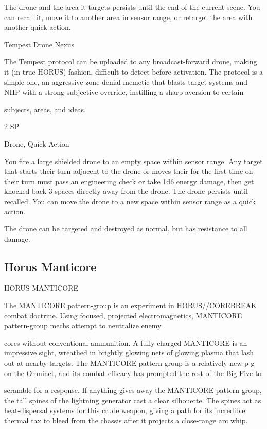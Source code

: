 The drone and the area it targets persists until the end of the current scene. You can recall it,  
move it to another area in sensor range, or retarget the area with another quick action.
 

Tempest Drone Nexus  

The Tempest protocol can be uploaded to any broadcast-forward drone, making it (in true HORUS) fashion,  
difficult to detect before activation. The protocol is a simple one, an aggressive zone-denial memetic that  
blasts target systems and NHP with a strong subjective override, instilling a sharp aversion to certain  

subjects, areas, and ideas.     

2 SP
 

Drone, Quick Action
 

You fire a large shielded drone to an empty space within sensor range. Any target that starts their  
turn adjacent to the drone or moves their for the first time on their turn must pass an engineering  
check or take 1d6 energy damage, then get knocked back 3 spaces directly away from the  
drone. The drone persists until recalled. You can move the drone to a new space within sensor  
range as a quick action. 
 

The drone can be targeted and destroyed as normal, but has resistance to all damage.
 

                                                                                                               
\subsection{Horus Manticore}

                                        HORUS MANTICORE  

The MANTICORE pattern-group is an experiment in HORUS//COREBREAK combat doctrine. Using  
focused, projected electromagnetics, MANTICORE pattern-group mechs attempt to neutralize enemy  

cores without conventional ammunition. A fully charged MANTICORE is an impressive sight, wreathed in  
brightly glowing nets of glowing plasma that lash out at nearby targets. The MANTICORE pattern-group is  
a relatively new p-g on the Omninet, and its combat efficacy has prompted the rest of the Big Five to  

scramble for a response. If anything gives away the MANTICORE pattern group, the tall spines of the  
lightning generator cast a clear silhouette. The spines act as heat-dispersal systems for this crude weapon,  
giving a path for its incredible thermal tax to bleed from the chassis after it projects a close-range arc whip.  


